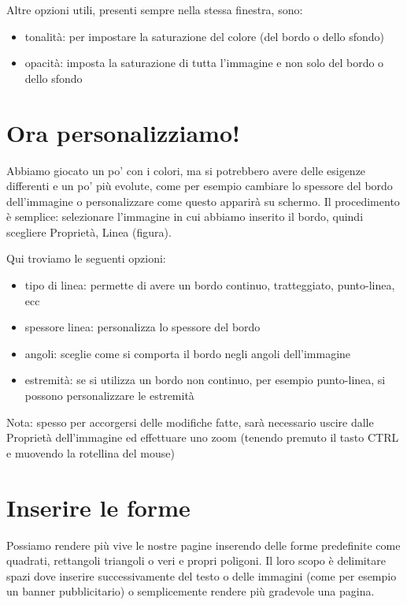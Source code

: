 \documentclass[a4paper, 12pt]{book}
\begin{document}
Altre opzioni utili, presenti sempre nella stessa finestra, sono:

\begin{itemize}
\item tonalità: per impostare la saturazione del colore (del bordo o dello sfondo)

\item opacità: imposta la saturazione di tutta l'immagine e non solo del bordo o dello sfondo
\end{itemize}

\section{Ora personalizziamo!}
Abbiamo giocato un po' con i colori, ma si potrebbero avere delle esigenze differenti e un po' più evolute, come per esempio cambiare lo spessore del bordo dell'immagine o personalizzare come questo apparirà su schermo. Il procedimento è semplice: selezionare l'immagine in cui abbiamo inserito il bordo, quindi scegliere Proprietà, Linea (figura).
 
Qui troviamo le seguenti opzioni:

\begin{itemize}
	\item tipo di linea: permette di avere un bordo continuo, tratteggiato, punto-linea, ecc
	
	\item spessore linea: personalizza lo spessore del bordo

	\item angoli: sceglie come si comporta il bordo negli angoli dell'immagine

	\item estremità: se si utilizza un bordo non continuo, per esempio punto-linea, si possono personalizzare le estremità
\end{itemize}

Nota: spesso per accorgersi delle modifiche fatte, sarà necessario uscire dalle Proprietà dell'immagine ed effettuare uno zoom (tenendo premuto il tasto CTRL e muovendo la rotellina del mouse)

\section{Inserire le forme}
Possiamo rendere più vive le nostre pagine inserendo delle forme predefinite come quadrati, rettangoli triangoli o veri e propri poligoni. Il loro scopo è delimitare spazi dove inserire successivamente del testo o delle immagini (come per esempio un banner pubblicitario) o semplicemente rendere più gradevole una pagina.
\end{document}
